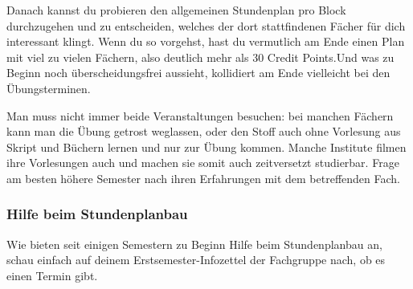 \begin{multicols}{2}
		Danach kannst du probieren den allgemeinen Stundenplan pro Block durchzugehen und zu entscheiden, welches der dort stattfindenen Fächer für dich interessant klingt. Wenn du so vorgehst, hast du vermutlich am Ende einen Plan mit viel zu vielen Fächern, also deutlich mehr als 30 Credit Points.Und was zu Beginn noch überscheidungsfrei aussieht, kollidiert am Ende vielleicht bei den Übungsterminen. 

		Man muss nicht immer beide Veranstaltungen besuchen: bei manchen Fächern kann man die Übung getrost weglassen, oder den Stoff auch ohne Vorlesung aus Skript und Büchern lernen und nur zur Übung kommen. Manche Institute filmen ihre Vorlesungen auch und machen sie somit auch zeitversetzt studierbar. Frage am besten höhere Semester nach ihren Erfahrungen mit dem betreffenden Fach.

	\subsubsection{Hilfe beim Stundenplanbau}
		Wie bieten seit einigen Semestern zu Beginn Hilfe beim Stundenplanbau an, schau einfach auf deinem Erstsemester-Infozettel der Fachgruppe nach, ob es einen Termin gibt.
\end{multicols}
